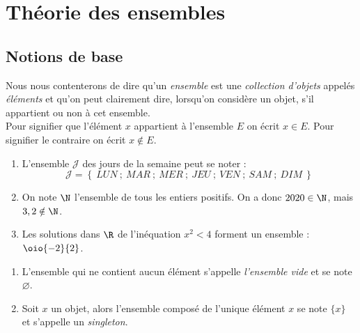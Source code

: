 \documentclass[a4paper,12pt,french]{book}
\let\emptyset\varnothing
\begin{document}
\chapter{Théorie des ensembles}

\section{Notions de base}

\begin{definition}
Nous nous contenterons de dire qu'un \textit{ensemble} est une \textit{collection d'objets}  appelés \textit{éléments} et qu'on peut clairement dire, lorsqu'on considère un objet, s'il appartient ou non à cet ensemble.\\
Pour signifier que l'élément $x$ appartient à l'ensemble $E$ on écrit $x\in E$. Pour signifier le contraire on écrit $x\notin E$.
\end{definition}

\begin{exemple}[s]
\begin{enumerate}[--]
\item
			L'ensemble $\mathcal{J}$ des jours de la semaine peut se noter :
			$$\mathcal{J}=\left\lbrace\ LUN\ ;\ MAR\ ;\ MER\ ;\ JEU\ ;\ VEN\ ;\ SAM\ ;\ DIM\ \right\rbrace $$


	\item 	On note $\N$ l'ensemble de tous les entiers positifs. On a donc $2020\in\N$, mais $3,2\notin\N$.
	\item 	Les solutions dans $\R$ de l'inéquation $x^2<4$ forment un ensemble : $\oio{-2}{2}$.
\end{enumerate}

\end{exemple}
\begin{definition}
\begin{enumerate}[--]
	\item 	L'ensemble qui ne contient aucun élément s'appelle \textit{l'ensemble vide} et se note $\emptyset$.
	\item 	Soit $x$ un objet, alors l'ensemble composé de l'unique élément $x$ se note $\{x\}$ et s'appelle un \textit{singleton}.
\end{enumerate}
\end{definition}
\end{document}
